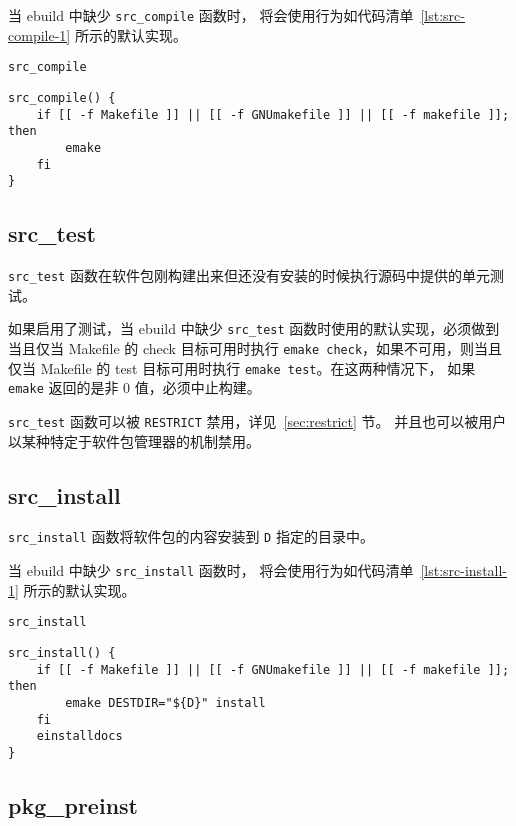 当 ebuild 中缺少 \texttt{src_compile} 函数时，
将会使用行为如代码清单~\ref{lst:src-compile-1} 所示的默认实现。

\begin{listing}[H]
\caption{\texttt{src_compile}} \label{lst:src-compile-1}
\begin{verbatim}
src_compile() {
    if [[ -f Makefile ]] || [[ -f GNUmakefile ]] || [[ -f makefile ]]; then
        emake
    fi
}
\end{verbatim}
\end{listing}

\subsection{src_test}

\texttt{src_test} 函数在软件包刚构建出来但还没有安装的时候执行源码中提供的单元测试。

如果启用了测试，当 ebuild 中缺少 \texttt{src_test} 函数时使用的默认实现，必须做到当且仅当
Makefile 的 check 目标可用时执行 \texttt{emake check}，如果不可用，则当且仅当 Makefile 的
test 目标可用时执行 \texttt{emake test}。在这两种情况下，
如果 \texttt{emake} 返回的是非 0 值，必须中止构建。

\texttt{src_test} 函数可以被 \texttt{RESTRICT} 禁用，详见~\ref{sec:restrict} 节。
并且也可以被用户以某种特定于软件包管理器的机制禁用。

\subsection{src_install}

\texttt{src_install} 函数将软件包的内容安装到 \texttt{D} 指定的目录中。

当 ebuild 中缺少 \texttt{src_install} 函数时，
将会使用行为如代码清单~\ref{lst:src-install-1} 所示的默认实现。

\begin{listing}[H]
\caption{\texttt{src_install}} \label{lst:src-install-1}
\begin{verbatim}
src_install() {
    if [[ -f Makefile ]] || [[ -f GNUmakefile ]] || [[ -f makefile ]]; then
        emake DESTDIR="${D}" install
    fi
    einstalldocs
}
\end{verbatim}
\end{listing}

\subsection{pkg_preinst}

